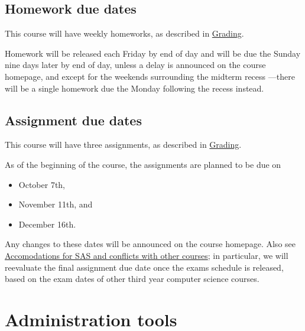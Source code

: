 \documentclass[11pt]{article}
\begin{document}
\subsection{Homework due dates}
\label{sec:org6f31b5b}
This course will have weekly homeworks, as described in \hyperref[sec:orgb6b5308]{Grading}.

Homework will be released each Friday by end of day
and will be due the Sunday nine days later by end of day,
unless a delay is announced on the course homepage,
and except for the weekends surrounding the midterm recess
—there will be a single homework due
the Monday following the recess instead.

\subsection{Assignment due dates}
\label{sec:org9dda189}
This course will have three assignments, as described in \hyperref[sec:orgb6b5308]{Grading}.

As of the beginning of the course,
the assignments are planned to be due on
\begin{itemize}
\item October 7th,
\item November 11th, and
\item December 16th.
\end{itemize}

Any changes to these dates will be announced on the course homepage.
Also see \hyperref[sec:org67ce0f1]{Accomodations for SAS and conflicts with other courses};
in particular, we will reevaluate the final assignment due date
once the exams schedule is released, based on the exam dates
of other third year computer science courses.

\section{Administration tools}
\label{sec:org1236d23}
\end{document}
